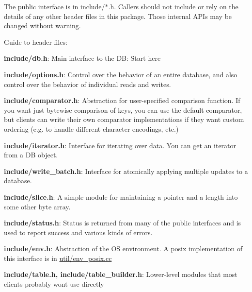 The public interface is in include/$\ast$.h. Callers should not include or rely on the details of any other header files in this package. Those internal A\+P\+Is may be changed without warning.

Guide to header files\+:


\begin{DoxyItemize}
\item {\bfseries include/db.\+h}\+: Main interface to the D\+B\+: Start here
\item {\bfseries include/options.\+h}\+: Control over the behavior of an entire database, and also control over the behavior of individual reads and writes.
\item {\bfseries include/comparator.\+h}\+: Abstraction for user-\/specified comparison function. If you want just bytewise comparison of keys, you can use the default comparator, but clients can write their own comparator implementations if they want custom ordering (e.\+g. to handle different character encodings, etc.)
\item {\bfseries include/iterator.\+h}\+: Interface for iterating over data. You can get an iterator from a D\+B object.
\item {\bfseries include/write\+\_\+batch.\+h}\+: Interface for atomically applying multiple updates to a database.
\item {\bfseries include/slice.\+h}\+: A simple module for maintaining a pointer and a length into some other byte array.
\item {\bfseries include/status.\+h}\+: Status is returned from many of the public interfaces and is used to report success and various kinds of errors.
\item {\bfseries include/env.\+h}\+: Abstraction of the O\+S environment. A posix implementation of this interface is in \hyperlink{env__posix_8cc}{util/env\+\_\+posix.\+cc}
\item {\bfseries include/table.\+h, include/table\+\_\+builder.\+h}\+: Lower-\/level modules that most clients probably won\textquotesingle{}t use directly 
\end{DoxyItemize}